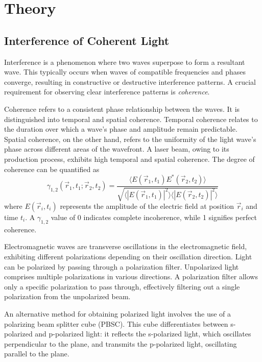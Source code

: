 \section{Theory}
\label{sec:theory}

\subsection{Interference of Coherent Light}
\label{sec:interference}
Interference is a phenomenon where two waves superpose to form a resultant wave. 
This typically occurs when waves of compatible frequencies and phases converge, 
resulting in constructive or destructive interference patterns. 
A crucial requirement for observing clear interference patterns is \textit{coherence}.

Coherence refers to a consistent phase relationship between the waves. 
It is distinguished into temporal and spatial coherence. Temporal coherence 
relates to the duration over which a wave's phase and amplitude remain predictable. 
Spatial coherence, on the other hand, refers to the uniformity of the light wave's 
phase across different areas of the wavefront. 
A laser beam, owing to its production process, exhibits high temporal and spatial 
coherence. The degree of coherence can be quantified as
\begin{equation}
    \gamma_{1,2}(\vec{r}_1,t_1;\vec{r}_2,t_2)=
    \frac{\langle E(\vec{r}_1,t_1)E^*(\vec{r}_2,t_2) \rangle}{\sqrt{\langle |E(\vec{r}_1,t_1)|^2 \rangle\langle |E(\vec{r}_2,t_2)|^2 \rangle}}
    \label{eqn:degree}
\end{equation}
where $E(\vec{r}_i,t_i)$ represents the amplitude of the electric field at position $\vec{r}_i$ 
and time $t_i$. A $\gamma_{1,2}$ value of \num{0} indicates complete incoherence, while 
\num{1} signifies perfect coherence.

Electromagnetic waves are transverse oscillations in the electromagnetic field, 
exhibiting different polarizations depending on their oscillation direction. 
Light can be polarized by passing through a polarization filter. Unpolarized light 
comprises multiple polarizations in various directions. A polarization filter 
allows only a specific polarization to pass through, effectively filtering out a 
single polarization from the unpolarized beam.

An alternative method for obtaining polarized light involves the use of a polarizing 
beam splitter cube (PBSC). This cube differentiates between s-polarized and 
p-polarized light: it reflects the s-polarized light, which oscillates perpendicular 
to the plane, and transmits the p-polarized light, oscillating parallel to the plane.

